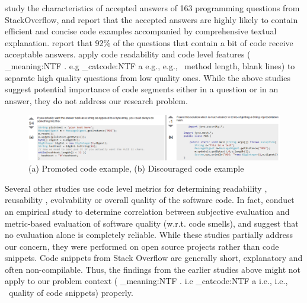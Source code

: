 \documentclass[conference]{IEEEtran}
\makeatletter
\newcommand\latinabbrev[1]{
  \peek_meaning:NTF . {%
    #1\@}%
  { \peek_catcode:NTF a {%
      #1., \@ }%
    {#1., \@}}}
\def\eg{\latinabbrev{e.g}}
\def\ie{\latinabbrev{i.e}}
\makeatother
\begin{document}
\citet{nasehi} study the characteristics of accepted answers of 163 programming questions from StackOverflow, and report that the accepted answers are highly likely to contain efficient and concise code examples accompanied by comprehensive textual explanation. \citet{nier} report that 92\% of the questions that contain a bit of code receive acceptable answers. \citet{qclassification} apply code readability and code level features (\eg\ method length, blank lines) to separate high quality questions from low quality ones. While the above studies suggest potential importance of code segments either in a question or in an answer, they do not address our research problem. 
\begin{figure}[!t]
\centering
\includegraphics[width=7in ]{whole23}
\caption{(a) Promoted code example, (b) Discouraged code example}
\vspace{-.2cm}
\label{fig:example}
\end{figure}
Several other studies use code level metrics for determining readability \cite{readability}, reusability \cite{reusability}, evolvability \cite{subjective} or overall quality \cite{lochmann, survey} of the software code. 
In fact, \citet{subjective} conduct an empirical study to determine correlation between subjective evaluation and metric-based evaluation of software quality (w.r.t. code smells), and suggest that no evaluation alone is completely reliable. While these studies partially address our concern, they were performed on open source projects rather than code snippets. Code snippets from Stack Overflow are generally short, explanatory and often non-compilable. Thus, the findings from the earlier studies above might not apply to our problem context (\ie\ quality of code snippets) properly.     
\end{document}
